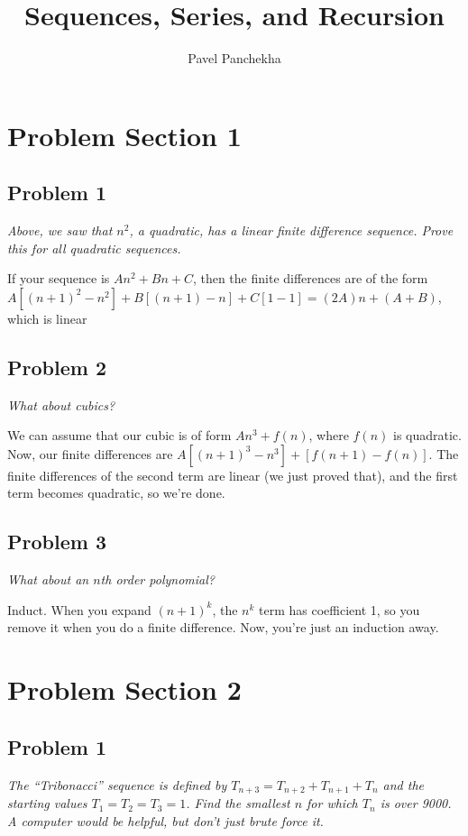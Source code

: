 \documentclass[12pt,letterpaper]{article}
\author{Pavel Panchekha}
\title{Sequences, Series, and Recursion}
\begin{document}
\maketitle

\section{Problem Section 1}
\subsection{Problem 1}
\emph{Above, we saw that $n^2$, a quadratic, has a linear finite difference
sequence. Prove this for all quadratic sequences.}

If your sequence is $An^2 + Bn + C$, then the finite differences are of the
form $A[(n+1)^2-n^2] + B[(n+1) - n] + C[1-1] = (2A)n + (A + B)$, which is
linear

\subsection{Problem 2}
\emph{What about cubics?}

We can assume that our cubic is of form $An^3 + f(n)$, where $f(n)$ is quadratic.
Now, our finite differences are $A[(n+1)^3 - n^3] + [f(n+1) - f(n)]$. The
finite differences of the second term are linear (we just proved that), and the
first term becomes quadratic, so we're done.

\subsection{Problem 3}
\emph{What about an $n$th order polynomial?}

Induct. When you expand $(n+1)^k$, the $n^k$ term has coefficient 1, so you remove
it when you do a finite difference. Now, you're just an induction away.

\pagebreak
\section{Problem Section 2}
\subsection{Problem 1}
\emph{The ``Tribonacci'' sequence is defined by $T_{n+3} = T_{n+2} + T_{n+1}
  + T_n$ and the starting values $T_1 = T_2 = T_3 = 1$. Find the smallest $n$
  for which $T_n$ is over 9000. A computer would be helpful, but don't just
  brute force it.}
\end{document}
